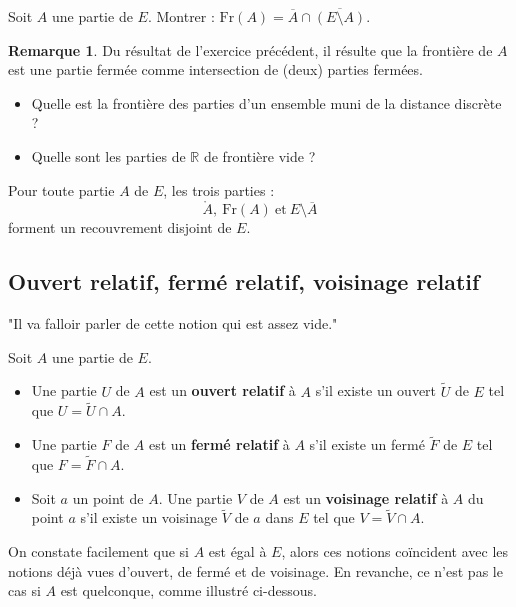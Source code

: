 \documentclass[french]{article}
\newcommand{\R}{\mathbb{R}}
\theoremstyle{plain}
\theoremstyle{definition}
\newtheorem*{rmq}{Remarque}
\theoremstyle{remark}
\begin{document}
\begin{exo}
	Soit $A$ une partie de $E$. Montrer : $\text{Fr}(A)=\overline{A}\cap\overline{(E\setminus A)}$.
\end{exo}

\begin{rmq}
	Du résultat de l'exercice précédent, il résulte que la frontière de $A$ est une partie fermée comme intersection de (deux) parties fermées.
\end{rmq}

\begin{exo}
	\begin{itemize}
		\item Quelle est la frontière des parties d'un ensemble muni de la distance discrète ?
		\item Quelle sont les parties de $\R$ de frontière vide ?
	\end{itemize}
\end{exo}

\begin{prop}%
	Pour toute partie $A$ de $E$, les trois parties : $$\mathring{A},\ \text{Fr}(A)\ \text{et}\ E\setminus\overline{A}$$ forment un recouvrement disjoint de $E$.
\end{prop}

\subsection{Ouvert relatif, fermé relatif, voisinage relatif}

"Il va falloir parler de cette notion qui est assez vide."

\begin{dfn}
	Soit $A$ une partie de $E$.
	\begin{itemize}
		\item Une partie $U$ de $A$ est un \textbf{ouvert relatif} à $A$ s'il existe un ouvert $\tilde{U}$ de $E$ tel que $U=\tilde{U}\cap A$.
		\item Une partie $F$ de $A$ est un \textbf{fermé relatif} à $A$ s'il existe un fermé $\tilde{F}$ de $E$ tel que $F=\tilde{F}\cap A$.
		\item Soit $a$ un point de $A$. Une partie $V$ de $A$ est un \textbf{voisinage relatif} à $A$ du point $a$ s'il existe un voisinage $\tilde{V}$ de $a$ dans $E$ tel que $V=\tilde{V}\cap A$.
	\end{itemize}
\end{dfn}

On constate facilement que si $A$ est égal à $E$, alors ces notions coïncident avec les notions déjà vues d'ouvert, de fermé et de voisinage. En revanche, ce n'est pas le cas si $A$ est quelconque, comme illustré ci-dessous.
\end{document}
